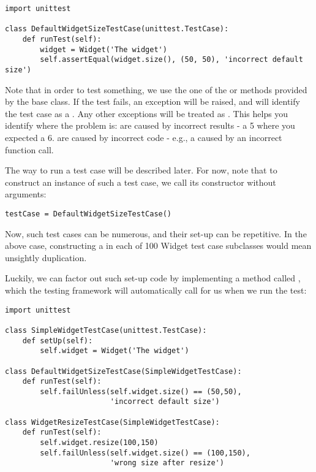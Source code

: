 \begin{verbatim}
import unittest

class DefaultWidgetSizeTestCase(unittest.TestCase):
    def runTest(self):
        widget = Widget('The widget')
        self.assertEqual(widget.size(), (50, 50), 'incorrect default size')
\end{verbatim}

Note that in order to test something, we use the one of the
 or  methods provided by the
 base class.  If the test fails, an exception will be
raised, and  will identify the test case as a
.  Any other exceptions will be treated as .
This helps you identify where the problem is:  are caused by
incorrect results - a 5 where you expected a 6.  are caused by
incorrect code - e.g., a  caused by an incorrect
function call.

The way to run a test case will be described later.  For now, note
that to construct an instance of such a test case, we call its
constructor without arguments:

\begin{verbatim}
testCase = DefaultWidgetSizeTestCase()
\end{verbatim}

Now, such test cases can be numerous, and their set-up can be
repetitive.  In the above case, constructing a  in each of
100 Widget test case subclasses would mean unsightly duplication.

Luckily, we can factor out such set-up code by implementing a method
called , which the testing framework will
automatically call for us when we run the test:

\begin{verbatim}
import unittest

class SimpleWidgetTestCase(unittest.TestCase):
    def setUp(self):
        self.widget = Widget('The widget')

class DefaultWidgetSizeTestCase(SimpleWidgetTestCase):
    def runTest(self):
        self.failUnless(self.widget.size() == (50,50),
                        'incorrect default size')

class WidgetResizeTestCase(SimpleWidgetTestCase):
    def runTest(self):
        self.widget.resize(100,150)
        self.failUnless(self.widget.size() == (100,150),
                        'wrong size after resize')
\end{verbatim}


